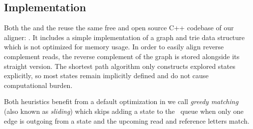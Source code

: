 \subsection{Implementation}

Both the \sh and the \prefixh reuse the same free and open source C++
codebase of our \astarix aligner: \astarixurl. It includes a simple
implementation of a graph and trie data structure which is not optimized for
memory usage. In order to easily align reverse complement reads, the reverse
complement of the graph is stored alongside its straight version. The shortest
path algorithm only constructs explored states explicitly, so most states remain
implicitly defined and do not cause computational burden.

Both heuristics benefit from a default optimization in \astarix we call
\emph{greedy matching} (also known as \emph{sliding}) which skips adding a state
to the \A~queue when only one edge is outgoing from a state and the upcoming
read and reference letters match.